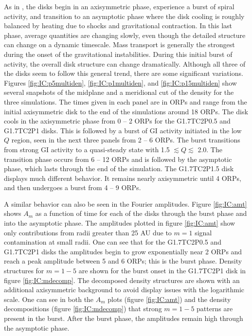 As in \citet{mejia2005}, the disks begin in an axisymmetric phase, experience a burst of spiral activity, and transition to an asymptotic phase where the disk cooling is roughly balanced by heating due to shocks and gravitational contraction. In this last phase, average quantities are changing slowly, even though the detailed structure can change on a dynamic timescale. Mass transport is generally the strongest during the onset of the gravitational instabilities. During this initial burst of activity, the overall disk structure can change dramatically. Although all three of the disks seem to follow this general trend, there are some significant variations. Figures \ref{fig:IC:p5multiden}, \ref{fig:IC:p1multiden}, and \ref{fig:IC:p15multiden} show several snapshots of the midplane and a meridional cut of the density for the three simulations. The times given in each panel are in ORPs and range from the initial axisymmetric disk to the end of the simulations around 18 ORPs. The disk cools in the axisymmetric phase from 0 -- 2 ORPs for the G1.7TC2P0.5 and G1.7TC2P1 disks. This is followed by a burst of GI activity initiated in the low $Q$ region, seen in the next three panels from 2 -- 6 ORPs. The burst transitions from strong GI activity to a quasi-steady state with 1.5 $\lesssim Q \lesssim$ 2.0. The transition phase occurs from 6 -- 12 ORPs and is followed by the asymptotic phase, which lasts through the end of the simulation. The G1.7TC2P1.5 disk displays much different behavior. It remains nearly axisymmetric until 4 ORPs, and then undergoes a burst from 4 -- 9 ORPs.

A similar behavior can also be seen in the Fourier amplitudes. Figure \ref{fig:IC:amt} shows $A_m$ as a function of time for each of the disks through the burst phase and into the asymptotic phase. The amplitudes plotted in figure \ref{fig:IC:amt} show only contributions from radii greater than 25 AU due to $m = 1$ signal contamination at small radii. One can see that for the G1.7TC2P0.5 and G1.7TC2P1 disks the amplitudes begin to grow exponentially near 2 ORPs and reach a peak amplitude between 5 and 6 ORPs; this is the burst phase. Density structures for $m = 1-5$ are shown for the burst onset in the G1.7TC2P1 disk in figure \ref{fig:IC:mdecomp}. The decomposed density structures are shown with an additional axisymmetric background to avoid display issues with the logarithmic scale. One can see in both the $A_m$ plots (figure \ref{fig:IC:amt}) and the density decompositions (figure \ref{fig:IC:mdecomp}) that strong $m = 1-5$ patterns are present in the burst. After the burst phase, the amplitudes remain high through the asymptotic phase. 

